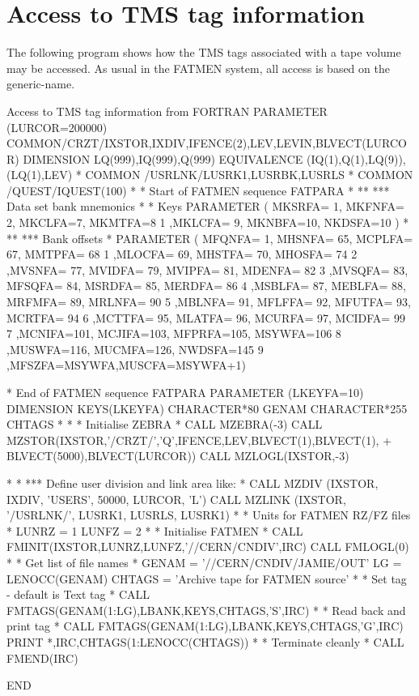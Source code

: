 \section{Access to TMS tag information}
\par
The following program shows how the TMS tags associated
with a tape volume may be accessed. As usual in the FATMEN
system, all access is based on the generic-name.
\begin{XMPt}{Access to TMS tag information from FORTRAN}
      PARAMETER (LURCOR=200000)
      COMMON/CRZT/IXSTOR,IXDIV,IFENCE(2),LEV,LEVIN,BLVECT(LURCOR)
      DIMENSION    LQ(999),IQ(999),Q(999)
      EQUIVALENCE (IQ(1),Q(1),LQ(9)),(LQ(1),LEV)
*
      COMMON /USRLNK/LUSRK1,LUSRBK,LUSRLS
*
      COMMON /QUEST/IQUEST(100)
*
* Start of FATMEN sequence FATPARA
*
** ***     Data set bank mnemonics
*
*          Keys
      PARAMETER ( MKSRFA= 1, MKFNFA= 2, MKCLFA=7, MKMTFA=8
     1           ,MKLCFA= 9, MKNBFA=10, NKDSFA=10 )
*
** ***     Bank offsets
*
      PARAMETER ( MFQNFA=  1, MHSNFA= 65, MCPLFA= 67, MMTPFA= 68
     1           ,MLOCFA= 69, MHSTFA= 70, MHOSFA= 74
     2           ,MVSNFA= 77, MVIDFA= 79, MVIPFA= 81, MDENFA= 82
     3           ,MVSQFA= 83, MFSQFA= 84, MSRDFA= 85, MERDFA= 86
     4           ,MSBLFA= 87, MEBLFA= 88, MRFMFA= 89, MRLNFA= 90
     5           ,MBLNFA= 91, MFLFFA= 92, MFUTFA= 93, MCRTFA= 94
     6           ,MCTTFA= 95, MLATFA= 96, MCURFA= 97, MCIDFA= 99
     7           ,MCNIFA=101, MCJIFA=103, MFPRFA=105, MSYWFA=106
     8           ,MUSWFA=116, MUCMFA=126, NWDSFA=145
     9           ,MFSZFA=MSYWFA,MUSCFA=MSYWFA+1)
 
* End of FATMEN sequence FATPARA
      PARAMETER (LKEYFA=10)
      DIMENSION KEYS(LKEYFA)
      CHARACTER*80  GENAM
      CHARACTER*255 CHTAGS
*
*
*     Initialise ZEBRA
*
      CALL MZEBRA(-3)
      CALL MZSTOR(IXSTOR,'/CRZT/','Q',IFENCE,LEV,BLVECT(1),BLVECT(1),
     +            BLVECT(5000),BLVECT(LURCOR))
      CALL MZLOGL(IXSTOR,-3)
 
*
* *** Define user division and link area like:
*
      CALL MZDIV  (IXSTOR, IXDIV, 'USERS', 50000, LURCOR, 'L')
      CALL MZLINK (IXSTOR, '/USRLNK/', LUSRK1, LUSRLS, LUSRK1)
*
*     Units for FATMEN RZ/FZ files
*
      LUNRZ = 1
      LUNFZ = 2
*
*     Initialise FATMEN
*
      CALL FMINIT(IXSTOR,LUNRZ,LUNFZ,'//CERN/CNDIV',IRC)
      CALL FMLOGL(0)
*
*     Get list of file names
*
      GENAM = '//CERN/CNDIV/JAMIE/OUT'
      LG    = LENOCC(GENAM)
      CHTAGS = 'Archive tape for FATMEN source'
*
*     Set tag - default is Text tag
*
      CALL FMTAGS(GENAM(1:LG),LBANK,KEYS,CHTAGS,'S',IRC)
*
*     Read back and print tag
*
      CALL FMTAGS(GENAM(1:LG),LBANK,KEYS,CHTAGS,'G',IRC)
      PRINT *,IRC,CHTAGS(1:LENOCC(CHTAGS))
*
*     Terminate cleanly
*
      CALL FMEND(IRC)
 
      END
 
\end{XMPt}

